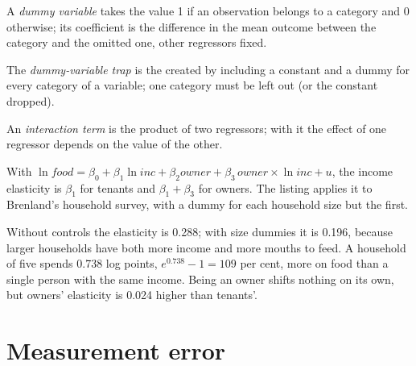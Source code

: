 \begin{definition}\label{def:b2:specification:dummy}
A \emph{dummy variable} takes the value 1 if an observation belongs to a category and 0 otherwise;
its coefficient is the difference in the mean outcome between the category and the omitted one, other regressors fixed.
\end{definition}

\begin{definition}\label{def:b2:specification:dummy-trap}
The \emph{dummy-variable trap} is the  created by including a constant and
a dummy for every category of a variable; one category must be left out (or the constant dropped).
\end{definition}

\begin{definition}\label{def:b2:specification:interaction}
An \emph{interaction term} is the product of two regressors; with it the effect of one regressor
depends on the value of the other.
\end{definition}

With $\ln\mathit{food} = \beta_0 + \beta_1\ln\mathit{inc} + \beta_2\mathit{owner} + \beta_3\,\mathit{owner}\times\ln\mathit{inc} + u$,
the income elasticity is $\beta_1$ for tenants and $\beta_1 + \beta_3$ for owners. The listing applies it to Brenland's
household survey, with a dummy for each household size but the first.

\label{lst:b2:specification:dummies}

\label{out:b2:specification:dummies}

Without controls the elasticity is 0.288; with size dummies it is 0.196, because larger households have both more income
and more mouths to feed. A household of five spends 0.738 log points, $e^{0.738} - 1 = 109$ per cent, more on food than a
single person with the same income. Being an owner shifts nothing on its own, but owners' elasticity is 0.024 higher than
tenants'.

\section{Measurement error}\label{sec:b2:specification:me}

